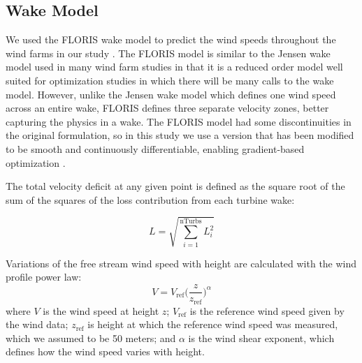 \documentclass[wes, manuscript]{copernicus}
\begin{document}
	\subsection{Wake Model}
	We used the FLORIS wake model to predict the wind speeds throughout the wind farms in our study \citep{gebraad2016wind}. The FLORIS model is similar to the Jensen wake model used in many wind farm studies \citep{jensen1983note} in that it is a reduced order model well suited for optimization studies in which there will be many calls to the wake model. However, unlike the Jensen wake model which defines one wind speed across an entire wake, FLORIS defines three separate velocity zones, better capturing the physics in a wake. 
The FLORIS model had some discontinuities in the original formulation, so in this study we use a version that has been modified to be smooth and continuously differentiable, enabling gradient-based optimization \citep{thomas2017improving}.


The total velocity deficit at any given point is defined as the square root of the sum of the squares of the loss contribution from each turbine wake:

\begin{equation}
L = \sqrt{\sum_{i=1}^\text{nTurbs}L_i^2}
\end{equation}



\noindent Variations of the free stream wind speed with height are calculated with the wind profile power law: 
\begin{equation}
V = V_{\text{ref}}\Big(\frac{z}{z_{\text{ref}}}\Big)^\alpha
\label{Eq:shear}
\end{equation}
where $V$ is the wind speed at height $z$; $V_{\text{ref}}$ is the reference wind speed given by the wind data; $z_{\text{ref}}$ is height at which the reference wind speed was measured, which we assumed to be 50 meters;  and $\alpha$ is the wind shear exponent, which defines how the wind speed varies with height.
      
\end{document}
